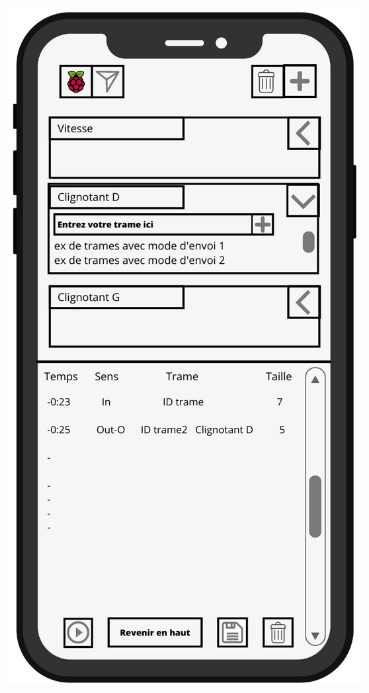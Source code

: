\begin{minipage}{0.5\linewidth}
    \centering
    \includegraphics[width=0.7\textwidth]{sections/3_Exigences_specifiques/1_IHM/ihm/ecranPrincipal.png}
    \captionsetup{justification=centering}
    \label{ecran_principal_ajout_trame}
\end{minipage}\hfill
